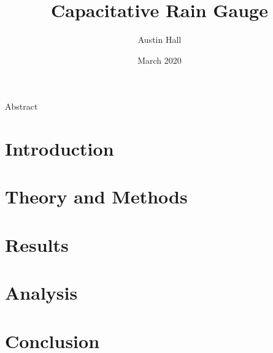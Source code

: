 \documentclass{article}
\author{Austin Hall}
\date{March 2020}
\title{\huge Capacitative Rain Gauge}
\begin{document}
\maketitle
\begin{center}
{\LARGE Abstract}\\
\end{center}

\newpage
\section{Introduction}


\newpage
\section{Theory and Methods}


\newpage
\section{Results}


\newpage
\section{Analysis}


\newpage
\section{Conclusion}
\newpage

\end{document}
